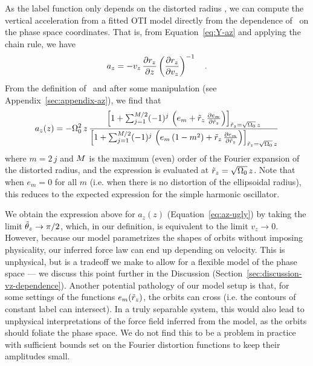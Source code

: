 As the label function only depends on the distorted radius \rz, we can compute the
vertical acceleration from a fitted OTI model directly from the dependence of \rz\ on
the phase space coordinates.
That is, from Equation~\ref{eq:Y-az} and applying the chain rule, we have
\begin{equation}
    a_z = - v_z \, \frac{\partial {r_z}}{\partial {z}} \left(\frac{\partial {r_z}}{\partial {v_z}}\right)^{-1} \quad .
\end{equation}
From the definition of \rz\ and after some manipulation (see
Appendix~\ref{sec:appendix-az}), we find that
\begin{equation}
    a_z(z) = - \Omega_0^2 \, z \,
    \frac{\left[
        1 + \sum_{j=1}^{M/2} (-1)^{j} \,
            \left(e_m + \tilde{r}_z \, \frac{\partial e_m}{\partial \tilde{r}_z}\right)
    \right]_{\tilde{r}_z = \sqrt{\Omega_0}\,z}}{\left[
        1 + \sum_{j=1}^{M/2} (-1)^{j} \,
            \left(e_m\,(1 - m^2) + \tilde{r}_z \, \frac{\partial e_m}{\partial \tilde{r}_z}\right)
    \right]_{\tilde{r}_z = \sqrt{\Omega_0}\,z}} \label{eq:az-ugly}
\end{equation}
where $m=2\,j$ and $M$ is the maximum (even) order of the Fourier expansion of the
distorted radius, and the expression is evaluated at $\tilde{r}_z = \sqrt{\Omega_0}\,z$.
Note that when $e_m = 0$ for all $m$ (i.e. when there is no distortion of the
ellipsoidal radius), this reduces to the expected expression for the simple harmonic
oscillator.

We obtain the expression above for $a_z(z)$ (Equation~\ref{eq:az-ugly}) by taking the
limit $\tilde{\theta}_z \rightarrow \pi/2$, which, in our definition, is equivalent to the limit
$v_z \rightarrow 0$.
However, because our model parametrizes the shapes of orbits without imposing
physicality, our inferred force law can end up depending on velocity.
This is unphysical, but is a tradeoff we make to allow for a flexible model of the phase
space --- we discuss this point further in the Discussion
(Section~\ref{sec:discussion-vz-dependence}).
Another potential pathology of our model setup is that, for some settings of the
functions $e_m(\tilde{r}_z)$, the orbits can cross (i.e. the contours of constant label can
intersect).
In a truly separable system, this would also lead to unphysical interpretations of the
force field inferred from the model, as the orbits should foliate the phase space.
We do not find this to be a problem in practice with sufficient bounds set on the
Fourier distortion functions to keep their amplitudes small.

